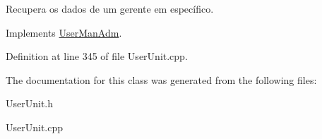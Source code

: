 Recupera os dados de um gerente em específico. 



Implements \hyperlink{classUserManAdm_a62e826d1c11061df021016e94e88f9ba}{User\-Man\-Adm}.



Definition at line 345 of file User\-Unit.\-cpp.



The documentation for this class was generated from the following files\-:\begin{DoxyCompactItemize}
\item 
User\-Unit.\-h\item 
User\-Unit.\-cpp\end{DoxyCompactItemize}
